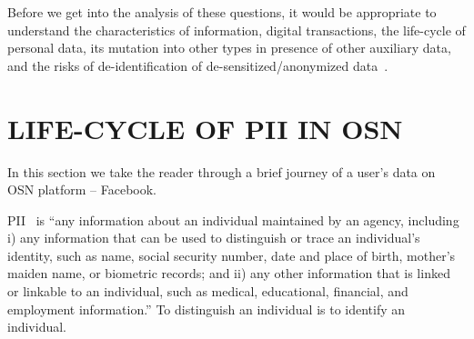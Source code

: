 \documentclass[runningheads]{llncs}
\begin{document}
Before we get into the analysis of these questions, it would be
appropriate to understand the characteristics of information, digital
transactions, the life-cycle of personal data, its mutation into
other types in presence of other auxiliary data, and the risks of
de-identification of de-sensitized/anonymized
data~\cite{paul-ohm-accretive}.

\section{LIFE-CYCLE OF PII IN OSN}
\label{sec:life-cycle}
\noindent In this section we take the reader through a brief journey
of a user's data on OSN platform -- Facebook.

PII~\cite{nist-pii} is ``any information about an individual
maintained by an agency, including i) any information that can be used
to distinguish or trace an individual's identity, such as name, social
security number, date and place of birth, mother's maiden name, or
biometric records; and ii) any other information that is linked or
linkable to an individual, such as medical, educational, financial,
and employment information.'' To distinguish an individual is to
identify an individual.
\end{document}
